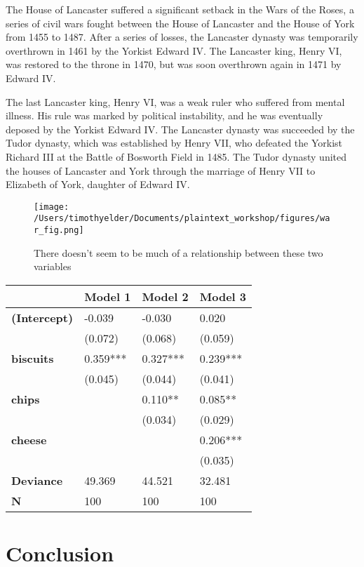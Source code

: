 \documentclass[11pt,article,oneside]{memoir}
\begin{document}
The House of Lancaster suffered a significant setback in the Wars of the
Roses, a series of civil wars fought between the House of Lancaster and
the House of York from 1455 to 1487. After a series of losses, the
Lancaster dynasty was temporarily overthrown in 1461 by the Yorkist
Edward IV. The Lancaster king, Henry VI, was restored to the throne in
1470, but was soon overthrown again in 1471 by Edward IV.

The last Lancaster king, Henry VI, was a weak ruler who suffered from
mental illness. His rule was marked by political instability, and he was
eventually deposed by the Yorkist Edward IV. The Lancaster dynasty was
succeeded by the Tudor dynasty, which was established by Henry VII, who
defeated the Yorkist Richard III at the Battle of Bosworth Field in
1485. The Tudor dynasty united the houses of Lancaster and York through
the marriage of Henry VII to Elizabeth of York, daughter of Edward IV.

\begin{figure}
\hypertarget{fig:example_fig}{%
\centering
\texttt{[image: /Users/timothyelder/Documents/plaintext\_workshop/figures/war\_fig.png]}
\caption{There doesn't seem to be much of a relationship between these
two variables}\label{fig:example_fig}
}
\end{figure}

\begin{longtable}[]{@{}llll@{}}
\toprule()
& \textbf{Model 1} & \textbf{Model 2} & \textbf{Model 3} \\
\midrule()
\endhead
\textbf{(Intercept)} & -0.039 & -0.030 & 0.020 \\
& (0.072) & (0.068) & (0.059) \\
\textbf{biscuits} & 0.359*** & 0.327*** & 0.239*** \\
& (0.045) & (0.044) & (0.041) \\
\textbf{chips} & & 0.110** & 0.085** \\
& & (0.034) & (0.029) \\
\textbf{cheese} & & & 0.206*** \\
& & & (0.035) \\
\textbf{Deviance} & 49.369 & 44.521 & 32.481 \\
\textbf{N} & 100 & 100 & 100 \\
\bottomrule()
\end{longtable}

\hypertarget{conclusion}{%
\section{Conclusion}\label{conclusion}}
\end{document}
